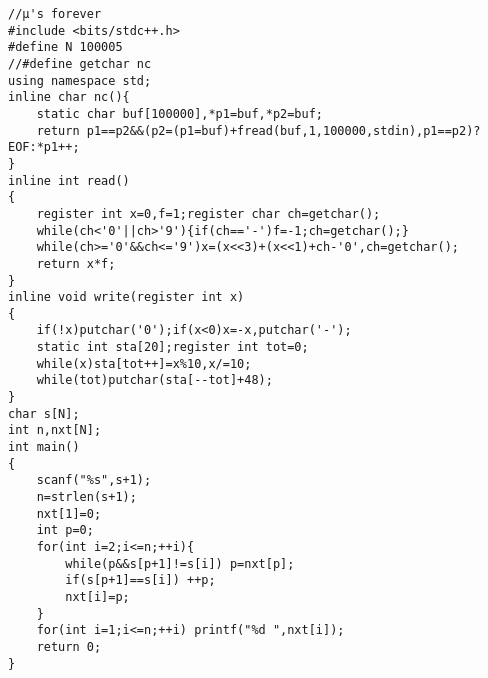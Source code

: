 \begin{verbatim}
//μ's forever
#include <bits/stdc++.h>
#define N 100005
//#define getchar nc
using namespace std;
inline char nc(){
    static char buf[100000],*p1=buf,*p2=buf;
    return p1==p2&&(p2=(p1=buf)+fread(buf,1,100000,stdin),p1==p2)?EOF:*p1++;
}
inline int read()
{
    register int x=0,f=1;register char ch=getchar();
    while(ch<'0'||ch>'9'){if(ch=='-')f=-1;ch=getchar();}
    while(ch>='0'&&ch<='9')x=(x<<3)+(x<<1)+ch-'0',ch=getchar();
    return x*f;
}
inline void write(register int x)
{
    if(!x)putchar('0');if(x<0)x=-x,putchar('-');
    static int sta[20];register int tot=0;
    while(x)sta[tot++]=x%10,x/=10;
    while(tot)putchar(sta[--tot]+48);
}
char s[N];
int n,nxt[N];
int main()
{
    scanf("%s",s+1);
    n=strlen(s+1);
    nxt[1]=0;
    int p=0;
    for(int i=2;i<=n;++i){
        while(p&&s[p+1]!=s[i]) p=nxt[p];
        if(s[p+1]==s[i]) ++p;
        nxt[i]=p;
    }
    for(int i=1;i<=n;++i) printf("%d ",nxt[i]);
    return 0;
}
\end{verbatim}
